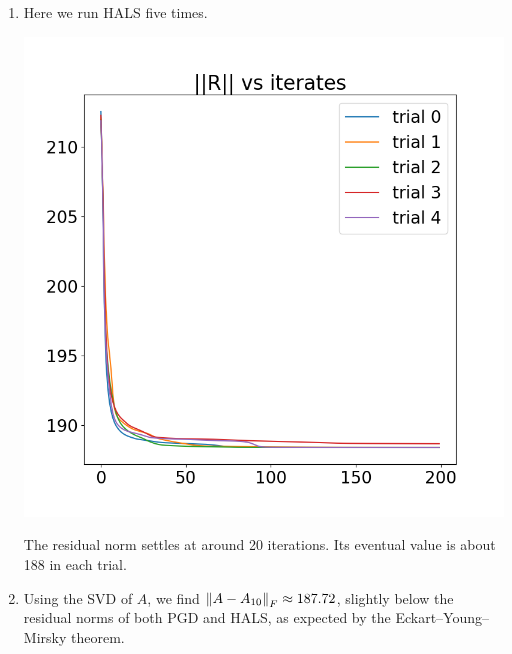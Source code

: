 \documentclass{article}
\begin{document}
\begin{enumerate}
\begin{enumerate}
		\item Here we run HALS five times.
		\begin{center}
			\includegraphics[scale=.3]{hw6 hals}
		\end{center}
		The residual norm settles at around 20 iterations. Its eventual value is about 188 in each trial. 
		

		
		\item Using the SVD of $A$, we find $\norm{A-A_{10}}_F\approx 187.72$, slightly below the residual norms of both PGD and HALS, as expected by the Eckart--Young--Mirsky theorem.
		
		
		
	\end{enumerate}
	
	
	
\end{enumerate}

	
	
\end{document}
